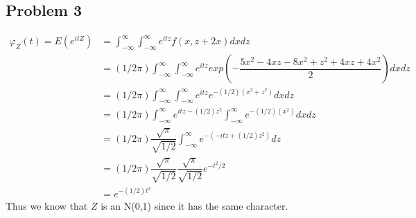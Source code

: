 \documentclass[12pt, letterpaper]{article}
\theoremstyle{definition}
\begin{document}
\newpage
\subsection*{Problem 3}
\begin{align*}
    \varphi_Z(t)=E(e^{itZ})&=\int_{-\infty}^{\infty}\int_{-\infty}^{\infty}e^{itz}f(x,z+2x)dxdz\\
    &=(1/2\pi)\int_{-\infty}^{\infty}\int_{-\infty}^{\infty}e^{itz}exp\left(  -\dfrac{5x^2-4xz-8x^2+z^2+4xz+4x^2}{2}\right)dxdz\\
    &=(1/2\pi)\int_{-\infty}^{\infty}\int_{-\infty}^{\infty}e^{itz}e^{-(1/2)(x^2+z^2)}dxdz\\
    &=(1/2\pi)\int_{-\infty}^{\infty}e^{itz-(1/2)z^2}\int_{-\infty}^{\infty}e^{-(1/2)(x^2)}dxdz\\
    &=(1/2\pi)\dfrac{\sqrt{\pi}}{\sqrt{1/2}}\int_{-\infty}^{\infty}e^{-(-itz+(1/2)z^2)}dz\\
    &=(1/2\pi)\dfrac{\sqrt{\pi}}{\sqrt{1/2}}\dfrac{\sqrt{\pi}}{\sqrt{1/2}}e^{-t^2/2}\\
    &=e^{-(1/2)t^2}
\end{align*}
Thus we know that $Z$ is an N(0,1) since it has the same character.
\end{document}
